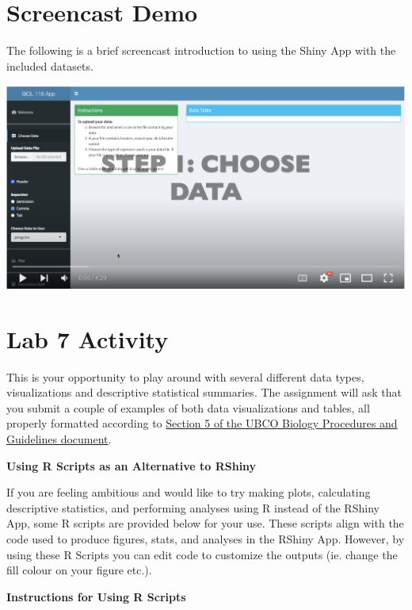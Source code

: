 \documentclass[
]{book}
\begin{document}
\hypertarget{screencast-demo}{%
\chapter*{Screencast Demo}\label{screencast-demo}}

The following is a brief screencast introduction to using the Shiny App with the included datasets.

\includegraphics{figures_images/Lab7-Fig1.png}

\hypertarget{lab-7-activity}{%
\chapter*{Lab 7 Activity}\label{lab-7-activity}}

This is your opportunity to play around with several different data types, visualizations and descriptive statistical summaries. The assignment will ask that you submit a couple of examples of both data visualizations and tables, all properly formatted according to \href{https://ubco-biology.github.io/Procedures-and-Guidelines/figures-tables.html}{Section 5 of the UBCO Biology Procedures and Guidelines document}.

\textbf{Using R Scripts as an Alternative to RShiny}

If you are feeling ambitious and would like to try making plots, calculating descriptive statistics, and performing analyses using R instead of the RShiny App, some R scripts are provided below for your use. These scripts align with the code used to produce figures, stats, and analyses in the RShiny App. However, by using these R Scripts you can edit code to customize the outputs (ie. change the fill colour on your figure etc.).

\textbf{Instructions for Using R Scripts}
\end{document}
